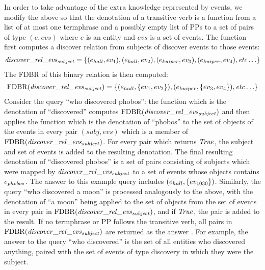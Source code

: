 \documentclass[../main.tex]{subfiles}
\begin{document}
\begin{refsection}
In order to take advantage of the extra knowledge represented by events, we modify the above so
that the denotation of a transitive verb is a function from a list of at most one termphrase and a possibly empty list of PPs to a set of pairs of type $(e,\mathit{evs})$ where $e$ is an entity and $\mathit{evs}$ is a set of events.
The function first computes a discover relation from subjects of discover events to those events:
\begin{multline*}
	\mathit{discover\_rel}\_\mathit{evs}_\mathit{subject} = \{ (e_{hall}, ev_{\mathrm{1}}), (e_{hall}, ev_{\mathrm{2}}), (e_{kuiper}, ev_{\mathrm{3}}), (e_{kuiper}, ev_{\mathrm{4}}), \mathit{etc} \ldots \}
\end{multline*}
The FDBR of this binary relation is then computed:
\begin{multline*}
	\mathrm{FDBR}({\mathit{discover\_rel}\_\mathit{evs}_{\mathit{subject}}}) = \{(e_{hall}, \{ev_{\mathrm{1}}, ev_{\mathrm{2}}\}), (e_{kuiper}, \{ev_{\mathrm{3}}, ev_{\mathrm{4}}\}), \mathit{etc} \ldots \}
\end{multline*}
Consider the query ``who discovered phobos'': the function which is the denotation
of ``discovered'' computes $\mathrm{FDBR}({\mathit{discover\_rel}\_\mathit{evs}_{\mathit{subject}}})$ and then applies the function which is the
denotation of ``phobos'' to the set of objects of the events in every pair $(\mathit{subj},\mathit{evs})$ which is a
member of \\ $\mathrm{FDBR}({\mathit{discover\_rel}\_\mathit{evs}_{\mathit{subject}}})$. For every pair which returns $\mathit{True}$, the subject and set of events is
added to the resulting denotation. The final resulting denotation of
``discovered phobos'' is a set of pairs consisting of subjects which were mapped by
$\mathit{discover\_rel}\_\mathit{evs}_{\mathit{subject}}$ to a set of events whose objects contains $e_{phobos}$. The answer to this example query includes $(e_{hall}, \{ev_{\mathrm{1030}}\})$. Similarly, the query ``who
discovered a moon'' is processed analogously to the above, with the denotation of ``a moon''
being applied to the set of objects from the set of events in every pair in $\mathrm{FDBR}({\mathit{discover\_rel}\_\mathit{evs}_{\mathit{subject}}})$,
and if $\mathit{True}$, the pair is added to the result.
If no termphrase or PP follows the transitive verb, all pairs in $\mathrm{FDBR}({\mathit{discover\_rel}\_\mathit{evs}_{\mathit{subject}}})$
are returned as the answer . For example, the answer to the query ``who discovered'' is the set of
all entities who discovered anything, paired with the set of events of type discovery in which
they were the subject.


\end{refsection}
\end{document}
